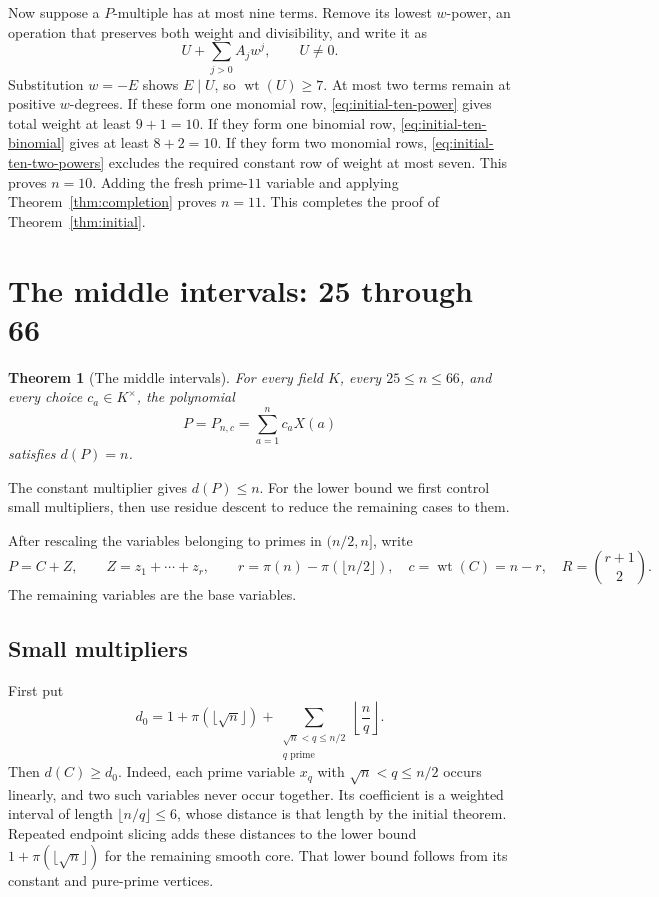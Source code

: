 \documentclass[11pt]{article}
\DeclareMathOperator{\wt}{wt}\DeclareMathOperator{\ord}{ord}
\numberwithin{equation}{section}
\newtheorem{theorem}{Theorem}[section]
\theoremstyle{definition}\newtheorem{definition}[theorem]{Definition}
\theoremstyle{remark}\newtheorem{remark}[theorem]{Remark}
\begin{document}
Now suppose a $P$-multiple has at most nine terms.  Remove its lowest
$w$-power, an operation that preserves both weight and divisibility,
and write it as
\[
 U+\sum_{j>0}A_jw^j,\qquad U\ne0.
\]
Substitution $w=-E$ shows $E\mid U$, so $\wt(U)\geq7$.  At most two
terms remain at positive $w$-degrees.  If these form one monomial row,
\eqref{eq:initial-ten-power} gives total weight at least $9+1=10$.
If they form one binomial row, \eqref{eq:initial-ten-binomial} gives
at least $8+2=10$.  If they form two monomial rows,
\eqref{eq:initial-ten-two-powers} excludes the required constant row
of weight at most seven.  This proves $n=10$.  Adding the fresh
prime-$11$ variable and applying Theorem~\ref{thm:completion} proves
$n=11$.
This completes the proof of Theorem~\ref{thm:initial}.

\clearpage
\section{The middle intervals: 25 through 66}
\label{sec:finite}

\begin{theorem}[The middle intervals]\label{thm:finite}
For every field $K$, every $25\le n\le66$, and every choice
$c_a\in K^\times$, the polynomial
\[
 P=P_{n,c}=\sum_{a=1}^n c_aX(a)
\]
satisfies $d(P)=n$.
\end{theorem}

The constant multiplier gives $d(P)\le n$. For the lower bound we
first control small multipliers, then use residue descent to reduce
the remaining cases to them.

After rescaling the variables belonging to primes in $(n/2,n]$, write
\begin{equation}\label{eq:fin-setup}
 P=C+Z,\qquad Z=z_1+\cdots+z_r,\qquad
 r=\pi(n)-\pi(\lfloor n/2\rfloor),\quad c=\wt(C)=n-r,
 \quad R=\binom{r+1}{2}.
\end{equation}
The remaining variables are the base variables.

\subsection{Small multipliers}

First put
\begin{equation}\label{eq:fin-d0}
 d_0=1+\pi(\lfloor\sqrt n\rfloor)
       +\sum_{\substack{\sqrt n<q\le n/2\\q\text{ prime}}}
                       \left\lfloor\frac nq\right\rfloor.
\end{equation}
Then $d(C)\ge d_0$. Indeed, each prime variable $x_q$ with
$\sqrt n<q\le n/2$ occurs linearly, and two such variables never occur
together. Its coefficient is a weighted interval of length
$\lfloor n/q\rfloor\le6$, whose distance is that length by the initial
theorem. Repeated endpoint slicing adds these distances to the lower
bound $1+\pi(\lfloor\sqrt n\rfloor)$ for the remaining smooth core.
That lower bound follows from its constant and pure-prime vertices.
\end{document}
